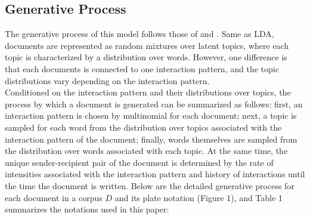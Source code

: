 \documentclass[a4paper]{article}
\begin{document}
\subsection{Generative Process}
The generative process of this model follows those of \cite{Blei2003} and \cite{rosen2004author}. Same as LDA, documents are represented as random mixtures over latent topics, where each topic is characterized by a distribution over words. However, one difference is that each documents is connected to one interaction pattern, and the topic distributions vary depending on the interaction pattern. \\ \newline Conditioned on the interaction pattern and their distributions over topics, the process by which a document is generated can be summarized as follows: first, an interaction pattern is chosen by multinomial for each document; next, a topic is sampled for each word from the distribution over topics associated with the interaction pattern of the document; finally, words themselves are sampled from the distribution over words associated with each topic. At the same time, the unique sender-recipient pair of the document is determined by the rate of intensities associated with the interaction pattern and history of interactions until the time the document is written. Below are the detailed generative process for each document in a corpus $D$ and its plate notation (Figure 1), and Table 1 summarizes the notations used in this paper:
\end{document}
